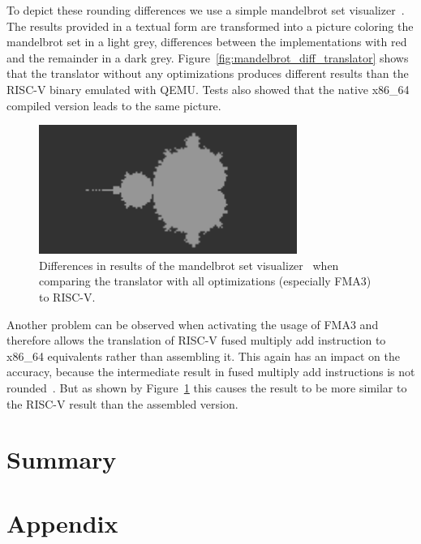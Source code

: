 \documentclass[course=eragp]{aspdoc}
\begin{document}
To depict these rounding differences we use a simple mandelbrot set
visualizer~\cite{mandelbrot_program}. The results provided in a textual form are transformed into a
picture coloring the mandelbrot set in a light grey, differences between the implementations with
red and the remainder in a dark grey. Figure~\ref{fig:mandelbrot_diff_translator} shows that the
translator without any optimizations produces different results than the RISC-V binary emulated with
QEMU. Tests also showed that the native x86\_64 compiled version leads to the same picture.

\par

\begin{figure}[H]
    \centering
    \includegraphics[width=0.75\textwidth]{images/mandelbrot_differences/fma_diff.png}
    \caption{Differences in results of the mandelbrot set visualizer~\cite{mandelbrot_program} when
        comparing the translator with all optimizations (especially FMA3) to RISC-V.}\label{fig:mandelbrot_diff_fma3}
\end{figure}

Another problem can be observed when activating the usage of FMA3 and therefore allows the
translation of RISC-V fused multiply add instruction to x86\_64 equivalents rather than assembling
it. This again has an impact on the accuracy, because the intermediate result in fused multiply add
instructions is not rounded~\cite{intel2017man}. But as shown by
Figure~\ref{fig:mandelbrot_diff_fma3} this causes the result to be more similar to the RISC-V result
than the assembled version.

\section{Summary}

\clearpage


{}

\appendix
\section{Appendix}
\end{document}

